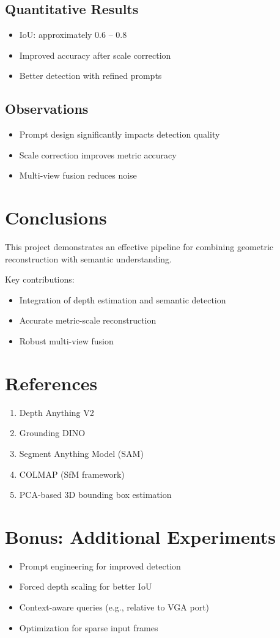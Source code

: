 \documentclass[11pt]{article}
\begin{document}
\subsection{Quantitative Results}

\begin{itemize}
\item IoU: approximately 0.6 -- 0.8
\item Improved accuracy after scale correction
\item Better detection with refined prompts
\end{itemize}

\subsection{Observations}
\begin{itemize}
\item Prompt design significantly impacts detection quality
\item Scale correction improves metric accuracy
\item Multi-view fusion reduces noise
\end{itemize}

\section{Conclusions}

This project demonstrates an effective pipeline for combining geometric reconstruction with semantic understanding.

Key contributions:
\begin{itemize}
\item Integration of depth estimation and semantic detection
\item Accurate metric-scale reconstruction
\item Robust multi-view fusion
\end{itemize}

\section{References}

\begin{enumerate}
\item Depth Anything V2
\item Grounding DINO
\item Segment Anything Model (SAM)
\item COLMAP (SfM framework)
\item PCA-based 3D bounding box estimation
\end{enumerate}

\section{Bonus: Additional Experiments}

\begin{itemize}
\item Prompt engineering for improved detection
\item Forced depth scaling for better IoU
\item Context-aware queries (e.g., relative to VGA port)
\item Optimization for sparse input frames
\end{itemize}
\end{document}

